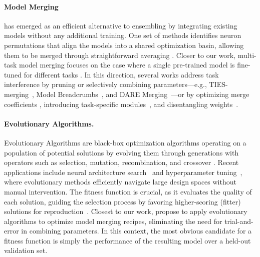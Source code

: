 
\paragraph{Model Merging} has emerged as an efficient alternative to ensembling by integrating existing models without any additional training. One set of methods identifies neuron permutations that align the models into a shared optimization basin, allowing them to be merged through straightforward averaging \citep{git-rebasin, repair, zip-it, rebasin-implicit-sinkhorn, cycle-consistent}. Closer to our work, multi-task model merging focuses on the case where a single pre-trained model is fine-tuned for different tasks \citep{task-vectors, ties, yu2024language, matenamerging, wortsman2022model, davari2023model, wang2024localizing, zhou2024atm, gargiulo2025tasksingularvectorsreducing}. 
In this direction, several works address task interference by pruning or selectively combining parameters---e.g., TIES-merging~\citep{ties}, Model Breadcrumbs~\citep{davari2023model}, and DARE Merging~\citep{yu2024language}—or by optimizing merge coefficients \citep{yang2023adamerging}, introducing task-specific modules~\citep{yang2024representation}, and disentangling weights~\citep{ortiz2024task}. 

\paragraph{Evolutionary Algorithms.}
Evolutionary Algorithms are black-box optimization algorithms operating on a population of potential solutions by evolving them through generations with operators such as selection, mutation, recombination, and crossover \citep{6791438, petrowski2017evolutionary, dasgupta1997evolutionary}. 
Recent applications include neural architecture search~\citep{real2019regularized} and hyperparameter tuning~\citep{vincent2023improved}, where evolutionary methods efficiently navigate large design spaces without manual intervention. 
The fitness function is crucial, as it evaluates the quality of each solution, guiding the selection process by favoring higher-scoring (fitter) solutions for reproduction~\citep{ea}. Closest to our work, \citet{sakana} propose to apply evolutionary algorithms to optimize model merging recipes, eliminating the need for trial-and-error in combining parameters. In this context, the most obvious candidate for a fitness function is simply the performance of the resulting model over a held-out validation set. 

